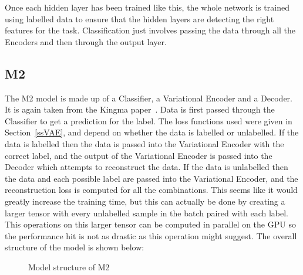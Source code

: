 Once each hidden layer has been trained like this, the whole network is trained using labelled data to ensure that the hidden layers 
are detecting the right features for the task. Classification just involves passing the data through all the Encoders and then through 
the output layer.

\subsection{M2}

The M2 model is made up of a Classifier, a Variational Encoder and a Decoder. It is again taken from the Kingma paper~\cite{DBLP:journals/corr/KingmaRMW14}.
Data is first passed through the Classifier to get a prediction for the label. The loss functions used were given in Section~\ref{ssVAE}, 
and depend on whether the data is labelled or unlabelled. If the data is labelled then the data is passed into the Variational Encoder 
with the correct label, and the output of the Variational Encoder is passed into the Decoder which attempts to reconstruct the data.
If the data is unlabelled then the data and each possible label are passed into the Variational Encoder, and the reconstruction loss 
is computed for all the combinations. This seems like it would greatly increase the training time, but this can actually be done 
by creating a larger tensor with every unlabelled sample in the batch paired with each label. This operations on this larger tensor 
can be computed in parallel on the GPU so the performance hit is not as drastic as this operation might suggest. The overall 
structure of the model is shown below:

\begin{figure}[H]
  \centering
  \caption{Model structure of M2}
\end{figure}

